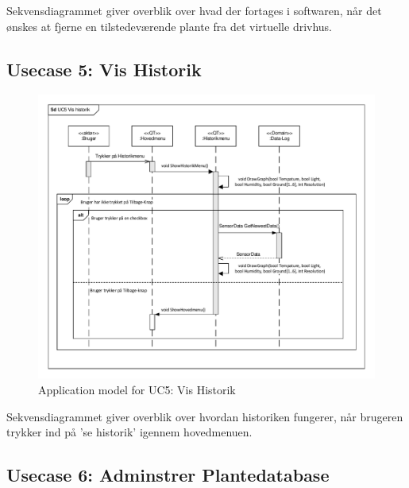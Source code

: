 Sekvensdiagrammet giver overblik over hvad der fortages i softwaren, når det ønskes at fjerne en tilstedeværende plante fra det virtuelle drivhus.

\clearpage

\subsection{Usecase 5: Vis Historik}

\begin{figure}[!h]
\centering 
\includegraphics[width={\textwidth}, trim=0 0 0 0, clip=true] {../fig/SD_autogreen_UC_5_Vis_historik.pdf}
\caption{Application model for UC5: Vis Historik}
\label{fig:SD_UC5}
\end{figure}

Sekvensdiagrammet giver overblik over hvordan historiken fungerer, når brugeren trykker ind på 'se historik' igennem hovedmenuen.

\clearpage

\subsection{Usecase 6: Adminstrer Plantedatabase}

